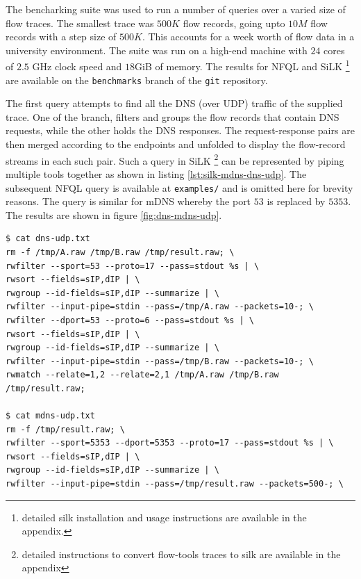 The bencharking suite was used to run a number of queries over a varied size
of flow traces. The smallest trace was $500K$ flow records, going upto $10M$
flow records with a step size of $500K$. This accounts for a week worth of
flow data in a university environment. The suite was run on a high-end machine
with $24$ cores of $2.5$ GHz clock speed and $18$GiB of memory. The results
for NFQL and SiLK \footnote{detailed silk installation and usage instructions
are available in the appendix.} \cite{SiLK} are available on the \texttt{benchmarks}
branch of the \texttt{git} repository.

The first query attempts to find all the DNS (over UDP) traffic of the
supplied trace. One of the branch, filters and groups the flow records that
contain DNS requests, while the other holds the DNS responses. The
request-response pairs are then merged according to the endpoints and unfolded
to  display the flow-record
streams in each such pair. Such a query in SiLK \footnote{detailed
instructions to convert flow-tools traces to silk are available in the
appendix} can be represented by piping multiple tools together as shown in
listing \ref{lst:silk-mdns-dns-udp}. The subsequent NFQL query is available at
\texttt{examples/} and is omitted here for brevity reasons. The query is
similar for mDNS whereby the port $53$ is replaced by $5353$. The results are
shown in figure \ref{fig:dns-mdns-udp}.

\begin{lstlisting}
$ cat dns-udp.txt
rm -f /tmp/A.raw /tmp/B.raw /tmp/result.raw; \
rwfilter --sport=53 --proto=17 --pass=stdout %s | \
rwsort --fields=sIP,dIP | \
rwgroup --id-fields=sIP,dIP --summarize | \
rwfilter --input-pipe=stdin --pass=/tmp/A.raw --packets=10-; \
rwfilter --dport=53 --proto=6 --pass=stdout %s | \
rwsort --fields=sIP,dIP | \
rwgroup --id-fields=sIP,dIP --summarize | \
rwfilter --input-pipe=stdin --pass=/tmp/B.raw --packets=10-; \
rwmatch --relate=1,2 --relate=2,1 /tmp/A.raw /tmp/B.raw /tmp/result.raw;

$ cat mdns-udp.txt
rm -f /tmp/result.raw; \
rwfilter --sport=5353 --dport=5353 --proto=17 --pass=stdout %s | \
rwsort --fields=sIP,dIP | \
rwgroup --id-fields=sIP,dIP --summarize | \
rwfilter --input-pipe=stdin --pass=/tmp/result.raw --packets=500-; \
\end{lstlisting}

